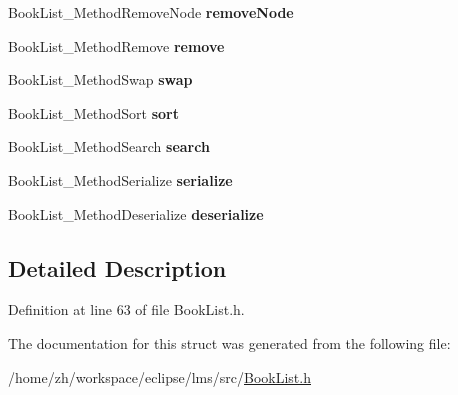 \begin{DoxyCompactItemize}
\item 
\hypertarget{structBookList__Methods_a067f25a654a8201e30bcd335dd4e6cb4}{Book\-List\-\_\-\-Method\-Remove\-Node {\bfseries remove\-Node}}\label{structBookList__Methods_a067f25a654a8201e30bcd335dd4e6cb4}

\item 
\hypertarget{structBookList__Methods_aef497cbf5b4084d3cce37915d6485520}{Book\-List\-\_\-\-Method\-Remove {\bfseries remove}}\label{structBookList__Methods_aef497cbf5b4084d3cce37915d6485520}

\item 
\hypertarget{structBookList__Methods_a7c77a8f9eaa2b66313a05a9bec8c6d1d}{Book\-List\-\_\-\-Method\-Swap {\bfseries swap}}\label{structBookList__Methods_a7c77a8f9eaa2b66313a05a9bec8c6d1d}

\item 
\hypertarget{structBookList__Methods_a777cba67578a5d9897af506c92b5eef8}{Book\-List\-\_\-\-Method\-Sort {\bfseries sort}}\label{structBookList__Methods_a777cba67578a5d9897af506c92b5eef8}

\item 
\hypertarget{structBookList__Methods_a40bf6787f3f73e991b3821c450b18140}{Book\-List\-\_\-\-Method\-Search {\bfseries search}}\label{structBookList__Methods_a40bf6787f3f73e991b3821c450b18140}

\item 
\hypertarget{structBookList__Methods_a014aa2655d68a482a9f91e71367a42ca}{Book\-List\-\_\-\-Method\-Serialize {\bfseries serialize}}\label{structBookList__Methods_a014aa2655d68a482a9f91e71367a42ca}

\item 
\hypertarget{structBookList__Methods_a2e532939e9a14b50d4c85889fc36fbae}{Book\-List\-\_\-\-Method\-Deserialize {\bfseries deserialize}}\label{structBookList__Methods_a2e532939e9a14b50d4c85889fc36fbae}

\end{DoxyCompactItemize}


\subsection{Detailed Description}


Definition at line 63 of file Book\-List.\-h.



The documentation for this struct was generated from the following file\-:\begin{DoxyCompactItemize}
\item 
/home/zh/workspace/eclipse/lms/src/\hyperlink{BookList_8h}{Book\-List.\-h}\end{DoxyCompactItemize}
